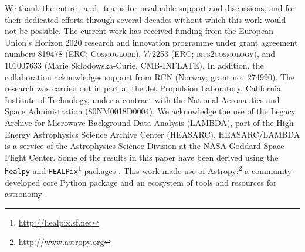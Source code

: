\begin{acknowledgements}
  We thank the entire \Planck\ and \WMAP\ teams for invaluable support
  and discussions, and for their dedicated efforts through several
  decades without which this work would not be possible. The current
  work has received funding from the European Union’s Horizon 2020
  research and innovation programme under grant agreement numbers
  819478 (ERC; \textsc{Cosmoglobe}), 772253 (ERC;
  \textsc{bits2cosmology}), and 101007633 (Marie Skłodowska-Curie,
  \textsc{CMB-INFLATE}). In addition, the collaboration acknowledges
  support from RCN (Norway; grant no.\ 274990). The research was
  carried out in part at the Jet Propulsion Laboratory, California
  Institute of Technology, under a contract with the National
  Aeronautics and Space Administration (80NM0018D0004).  We
  acknowledge the use of the Legacy Archive for Microwave Background
  Data Analysis (LAMBDA), part of the High Energy Astrophysics Science
  Archive Center (HEASARC). HEASARC/LAMBDA is a service of the
  Astrophysics Science Division at the NASA Goddard Space Flight
  Center.  Some of the results in this paper have been derived using
  the \texttt{healpy} and
  \texttt{HEALPix}\footnote{\url{http://healpix.sf.net}} packages
  \citep{gorski2005, Zonca2019}.  This work made use of
  Astropy:\footnote{\url{http://www.astropy.org}} a
  community-developed core Python package and an ecosystem of tools
  and resources for astronomy \citep{astropy:2013, astropy:2018,
    astropy:2022}.
\end{acknowledgements}
